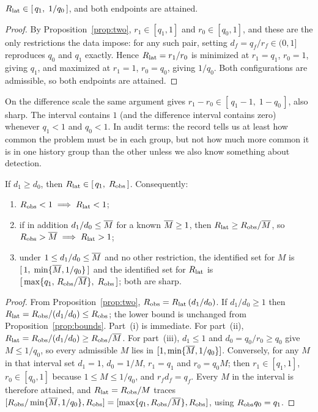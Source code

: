 \begin{proposition}\label{prop:bounds}
$R_{\mathrm{lat}} \in [\,q_1,\; 1/q_0\,]$, and both endpoints are attained.
\end{proposition}

\begin{proof}
By Proposition~\ref{prop:two}, $r_1 \in [q_1, 1]$ and $r_0 \in [q_0, 1]$, and
these are the only restrictions the data impose: for any such pair, setting
$d_f = q_f/r_f \in (0,1]$ reproduces $q_0$ and $q_1$ exactly. Hence
$R_{\mathrm{lat}} = r_1/r_0$ is minimized at $r_1 = q_1$, $r_0 = 1$, giving
$q_1$, and maximized at $r_1 = 1$, $r_0 = q_0$, giving $1/q_0$. Both
configurations are admissible, so both endpoints are attained.
\end{proof}

On the difference scale the same argument gives
$r_1 - r_0 \in [\,q_1 - 1,\; 1 - q_0\,]$, also sharp. The interval contains $1$
(and the difference interval contains zero) whenever $q_1 < 1$ and $q_0 < 1$.
In audit terms: the record tells us at least how common the problem must be in
each group, but not how much more common it is in one history group than the
other unless we also know something about detection.

\begin{proposition}\label{prop:mono}
If $d_1 \geq d_0$, then $R_{\mathrm{lat}} \in [\,q_1,\; R_{\mathrm{obs}}\,]$.
Consequently:
\begin{enumerate}
\item[(i)] $R_{\mathrm{obs}} < 1 \implies R_{\mathrm{lat}} < 1$;
\item[(ii)] if in addition $d_1/d_0 \leq \overline{M}$ for a known $\overline{M} \geq 1$,
then $R_{\mathrm{lat}} \geq R_{\mathrm{obs}}/\overline{M}$, so $R_{\mathrm{obs}} > \overline{M} \implies R_{\mathrm{lat}} > 1$;
\item[(iii)] under $1 \le d_1/d_0 \le \overline{M}$ and no other restriction, the
identified set for $M$ is $[\,1,\; \min\{\overline{M}, 1/q_0\}\,]$ and the identified
set for $R_{\mathrm{lat}}$ is $[\,\max\{q_1,\, R_{\mathrm{obs}}/\overline{M}\},\; R_{\mathrm{obs}}\,]$; both are sharp.
\end{enumerate}
\end{proposition}

\begin{proof}
From Proposition~\ref{prop:two}, $R_{\mathrm{obs}} = R_{\mathrm{lat}}\,(d_1/d_0)$. If $d_1/d_0 \geq
1$ then $R_{\mathrm{lat}} = R_{\mathrm{obs}}/(d_1/d_0) \leq R_{\mathrm{obs}}$; the lower bound is unchanged
from Proposition~\ref{prop:bounds}. Part~(i) is immediate. For part~(ii),
$R_{\mathrm{lat}} = R_{\mathrm{obs}}/(d_1/d_0) \geq R_{\mathrm{obs}}/\overline{M}$. For part~(iii), $d_1 \le 1$ and
$d_0 = q_0/r_0 \ge q_0$ give $M \le 1/q_0$, so every admissible $M$ lies in
$[1, \min\{\overline{M}, 1/q_0\}]$. Conversely, for any $M$ in that interval set $d_1
= 1$, $d_0 = 1/M$, $r_1 = q_1$ and $r_0 = q_0 M$; then $r_1 \in [q_1, 1]$, $r_0
\in [q_0, 1]$ because $1 \le M \le 1/q_0$, and $r_f d_f = q_f$. Every $M$ in
the interval is therefore attained, and $R_{\mathrm{lat}} = R_{\mathrm{obs}}/M$ traces
$[R_{\mathrm{obs}}/\min\{\overline{M}, 1/q_0\}, R_{\mathrm{obs}}] = [\max\{q_1, R_{\mathrm{obs}}/\overline{M}\}, R_{\mathrm{obs}}]$,
using $R_{\mathrm{obs}} q_0 = q_1$.
\end{proof}

